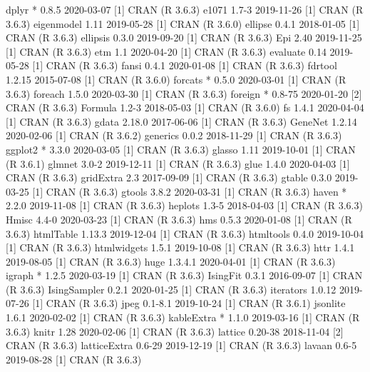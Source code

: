 \documentclass[a4paper,12pt]{article} %
\begin{document}
\begin{Schunk}
\begin{Soutput}
 dplyr          * 0.8.5      2020-03-07 [1] CRAN (R 3.6.3)
 e1071            1.7-3      2019-11-26 [1] CRAN (R 3.6.3)
 eigenmodel       1.11       2019-05-28 [1] CRAN (R 3.6.0)
 ellipse          0.4.1      2018-01-05 [1] CRAN (R 3.6.3)
 ellipsis         0.3.0      2019-09-20 [1] CRAN (R 3.6.3)
 Epi              2.40       2019-11-25 [1] CRAN (R 3.6.3)
 etm              1.1        2020-04-20 [1] CRAN (R 3.6.3)
 evaluate         0.14       2019-05-28 [1] CRAN (R 3.6.3)
 fansi            0.4.1      2020-01-08 [1] CRAN (R 3.6.3)
 fdrtool          1.2.15     2015-07-08 [1] CRAN (R 3.6.0)
 forcats        * 0.5.0      2020-03-01 [1] CRAN (R 3.6.3)
 foreach          1.5.0      2020-03-30 [1] CRAN (R 3.6.3)
 foreign        * 0.8-75     2020-01-20 [2] CRAN (R 3.6.3)
 Formula          1.2-3      2018-05-03 [1] CRAN (R 3.6.0)
 fs               1.4.1      2020-04-04 [1] CRAN (R 3.6.3)
 gdata            2.18.0     2017-06-06 [1] CRAN (R 3.6.3)
 GeneNet          1.2.14     2020-02-06 [1] CRAN (R 3.6.2)
 generics         0.0.2      2018-11-29 [1] CRAN (R 3.6.3)
 ggplot2        * 3.3.0      2020-03-05 [1] CRAN (R 3.6.3)
 glasso           1.11       2019-10-01 [1] CRAN (R 3.6.1)
 glmnet           3.0-2      2019-12-11 [1] CRAN (R 3.6.3)
 glue             1.4.0      2020-04-03 [1] CRAN (R 3.6.3)
 gridExtra        2.3        2017-09-09 [1] CRAN (R 3.6.3)
 gtable           0.3.0      2019-03-25 [1] CRAN (R 3.6.3)
 gtools           3.8.2      2020-03-31 [1] CRAN (R 3.6.3)
 haven          * 2.2.0      2019-11-08 [1] CRAN (R 3.6.3)
 heplots          1.3-5      2018-04-03 [1] CRAN (R 3.6.3)
 Hmisc            4.4-0      2020-03-23 [1] CRAN (R 3.6.3)
 hms              0.5.3      2020-01-08 [1] CRAN (R 3.6.3)
 htmlTable        1.13.3     2019-12-04 [1] CRAN (R 3.6.3)
 htmltools        0.4.0      2019-10-04 [1] CRAN (R 3.6.3)
 htmlwidgets      1.5.1      2019-10-08 [1] CRAN (R 3.6.3)
 httr             1.4.1      2019-08-05 [1] CRAN (R 3.6.3)
 huge             1.3.4.1    2020-04-01 [1] CRAN (R 3.6.3)
 igraph         * 1.2.5      2020-03-19 [1] CRAN (R 3.6.3)
 IsingFit         0.3.1      2016-09-07 [1] CRAN (R 3.6.3)
 IsingSampler     0.2.1      2020-01-25 [1] CRAN (R 3.6.3)
 iterators        1.0.12     2019-07-26 [1] CRAN (R 3.6.3)
 jpeg             0.1-8.1    2019-10-24 [1] CRAN (R 3.6.1)
 jsonlite         1.6.1      2020-02-02 [1] CRAN (R 3.6.3)
 kableExtra     * 1.1.0      2019-03-16 [1] CRAN (R 3.6.3)
 knitr            1.28       2020-02-06 [1] CRAN (R 3.6.3)
 lattice          0.20-38    2018-11-04 [2] CRAN (R 3.6.3)
 latticeExtra     0.6-29     2019-12-19 [1] CRAN (R 3.6.3)
 lavaan           0.6-5      2019-08-28 [1] CRAN (R 3.6.3)

\end{Soutput}
\end{Schunk}
\end{document}
